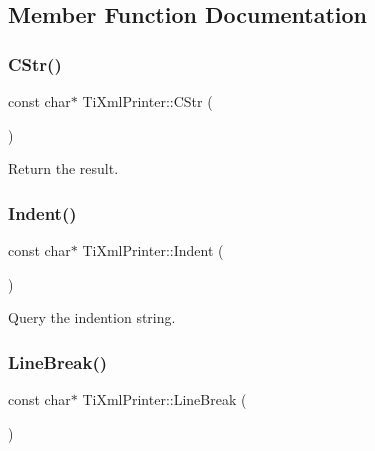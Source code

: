 \subsection{Member Function Documentation}
\mbox{\label{class_ti_xml_printer_a859eede9597d3e0355b77757be48735e}} 
\subsubsection{\texorpdfstring{C\+Str()}{CStr()}}
{\footnotesize\ttfamily const char$\ast$ Ti\+Xml\+Printer\+::\+C\+Str (\begin{DoxyParamCaption}{ }\end{DoxyParamCaption})\hspace{0.3cm}{\ttfamily [inline]}}



Return the result. 

\mbox{\label{class_ti_xml_printer_abb33ec7d4bad6aaeb57f4304394b133d}} 
\subsubsection{\texorpdfstring{Indent()}{Indent()}}
{\footnotesize\ttfamily const char$\ast$ Ti\+Xml\+Printer\+::\+Indent (\begin{DoxyParamCaption}{ }\end{DoxyParamCaption})\hspace{0.3cm}{\ttfamily [inline]}}



Query the indention string. 

\mbox{\label{class_ti_xml_printer_a11f1b4804a460b175ec244eb5724d96d}} 
\subsubsection{\texorpdfstring{Line\+Break()}{LineBreak()}}
{\footnotesize\ttfamily const char$\ast$ Ti\+Xml\+Printer\+::\+Line\+Break (\begin{DoxyParamCaption}{ }\end{DoxyParamCaption})\hspace{0.3cm}{\ttfamily [inline]}}



